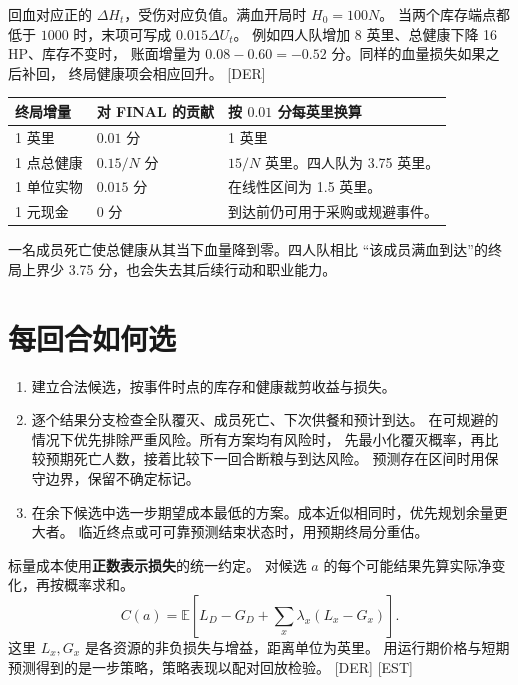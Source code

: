 \documentclass[UTF8,11pt,a4paper]{ctexart}
\newcommand{\src}[1]{\textup{\small\textcolor{muted}{[#1]}}}
\begin{document}
回血对应正的 $\Delta H_t$，受伤对应负值。满血开局时 $H_0=100N$。
当两个库存端点都低于 $1000$ 时，末项可写成 $0.015\Delta U_t$。
例如四人队增加 8 英里、总健康下降 16 HP、库存不变时，
账面增量为 $0.08-0.60=-0.52$ 分。同样的血量损失如果之后补回，
终局健康项会相应回升。 \src{DER}

\begin{center}\small
\begin{tabularx}{\linewidth}{@{}L{2.8cm}L{3.1cm}Y@{}}
\toprule
终局增量 & 对 FINAL 的贡献 & 按 $0.01$ 分每英里换算 \\
 英里 & $0.01$ 分 & 1 英里 \\
1 点总健康 & $0.15/N$ 分 & $15/N$ 英里。四人队为 3.75 英里。 \\
1 单位实物 & $0.015$ 分 & 在线性区间为 1.5 英里。 \\
1 元现金 & 0 分 & 到达前仍可用于采购或规避事件。 \\
\bottomrule
\end{tabularx}
\end{center}

\noindent 一名成员死亡使总健康从其当下血量降到零。四人队相比
“该成员满血到达”的终局上界少 3.75 分，也会失去其后续行动和职业能力。

\section{每回合如何选}\label{sec:policy}

\begin{enumerate}
  \item 建立合法候选，按事件时点的库存和健康裁剪收益与损失。
  \item 逐个结果分支检查全队覆灭、成员死亡、下次供餐和预计到达。
  在可规避的情况下优先排除严重风险。所有方案均有风险时，
  先最小化覆灭概率，再比较预期死亡人数，接着比较下一回合断粮与到达风险。
  预测存在区间时用保守边界，保留不确定标记。
  \item 在余下候选中选一步期望成本最低的方案。成本近似相同时，优先规划余量更大者。
  临近终点或可可靠预测结束状态时，用预期终局分重估。
\end{enumerate}

标量成本使用\textbf{正数表示损失}的统一约定。
对候选 $a$ 的每个可能结果先算实际净变化，再按概率求和。
\[
C(a)=\mathbb{E}\!\left[L_D-G_D+\sum_x\lambda_x(L_x-G_x)\right].
\]
这里 $L_x,G_x$ 是各资源的非负损失与增益，距离单位为英里。
用运行期价格与短期预测得到的是一步策略，策略表现以配对回放检验。 \src{DER} \src{EST}
\end{document}

